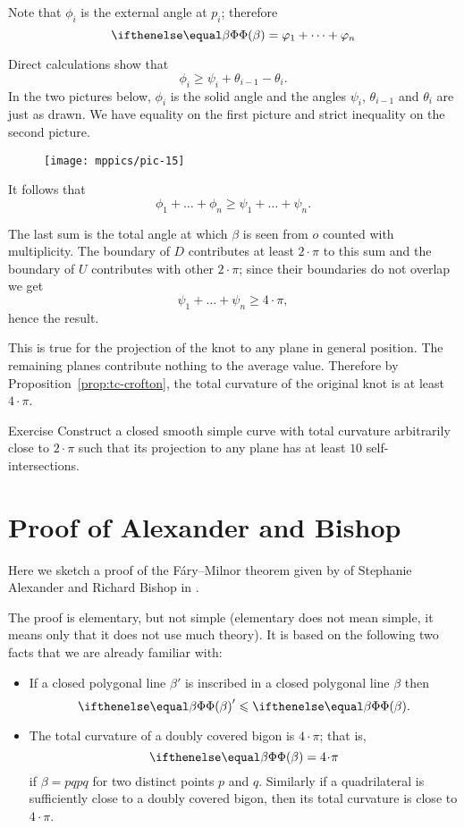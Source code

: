 Note that $\phi_i$ is the external angle at $p_i$;
therefore 
\[\tc\beta= \phi_1+\dots+\phi_n\]

Direct calculations show that 
\[\phi_i\ge \psi_i+\theta_{i-1}-\theta_i.\]
In the two pictures below, $\phi_i$ is the solid angle and 
the angles $\psi_i$, $\theta_{i-1}$ and $\theta_i$
are just as drawn.
We have equality on the first picture and strict inequality on the second picture.

\begin{figure}[h]
\vskip-0mm
\centering
\texttt{[image: mppics/pic-15]}
\vskip0mm
\end{figure}

It follows that 
\[\phi_1+\dots+\phi_n\ge \psi_1+\dots+\psi_n.\]

The last sum 
is the total angle at  which $\beta$ is seen from $o$ counted with multiplicity. 
The boundary of $D$ contributes at least $2\cdot\pi$ to this sum and the boundary of $U$ contributes with other $2\cdot\pi$;
since their boundaries do not overlap we get 
\[\psi_1+\dots+\psi_n\ge 4\cdot\pi,\]
hence the result.

This is true for the projection of the knot to any plane in general position.
The remaining planes contribute nothing to the average value.
Therefore by Proposition~\ref{prop:tc-crofton}, the total curvature of the original knot is at least $4\cdot\pi$.
\qeds



\begin{thm}{Exercise}
Construct a closed smooth simple curve with total curvature arbitrarily close to $2\cdot\pi$ such that its projection to any plane has at least $10$ self-intersections.   
\end{thm}



\section{Proof of Alexander and Bishop}

Here we sketch a proof of the F\'ary--Milnor theorem given by of Stephanie Alexander and Richard Bishop in \cite{alexander-bishop}.

The proof is elementary, but not simple 
(elementary does not mean simple, it means only that it does not use much theory).
It is based on the following two facts that we are already familiar with:
\begin{itemize}
\item If a closed polygonal line $\beta'$ is inscribed in a closed polygonal line $\beta$ then 
 \[\tc\beta'\le \tc\beta.\]
\item The total curvature of a doubly covered
bigon is $4\cdot\pi$; that is,
\[\tc\beta=4\cdot\pi\]
if $\beta=pqpq$ for two distinct points $p$ and $q$.
Similarly if a quadrilateral is sufficiently close to a doubly covered
bigon, then its total curvature is close to $4\cdot\pi$.
\end{itemize}


